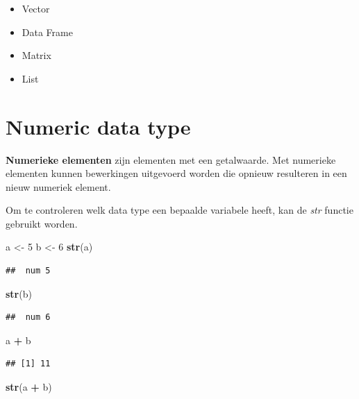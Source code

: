 \documentclass[
]{book}
\newenvironment{Shaded}{\begin{snugshade}}{\end{snugshade}}
\newcommand{\DecValTok}[1]{\textcolor[rgb]{0.00,0.00,0.81}{#1}}
\newcommand{\FunctionTok}[1]{\textcolor[rgb]{0.13,0.29,0.53}{\textbf{#1}}}
\newcommand{\NormalTok}[1]{#1}
\newcommand{\OtherTok}[1]{\textcolor[rgb]{0.56,0.35,0.01}{#1}}
\newcommand{\SpecialCharTok}[1]{\textcolor[rgb]{0.81,0.36,0.00}{\textbf{#1}}}
\providecommand{\tightlist}{%
  \setlength{\itemsep}{0pt}\setlength{\parskip}{0pt}}
\begin{document}
\begin{itemize}
\tightlist
\item
  Vector
\item
  Data Frame
\item
  Matrix
\item
  List
\end{itemize}

\hypertarget{numeric-data-type}{%
\section{Numeric data type}\label{numeric-data-type}}

\textbf{Numerieke elementen} zijn elementen met een getalwaarde. Met numerieke elementen kunnen bewerkingen uitgevoerd worden die opnieuw resulteren in een nieuw numeriek element.

Om te controleren welk data type een bepaalde variabele heeft, kan de \emph{str} functie
gebruikt worden.

\begin{Shaded}
\begin{Highlighting}[]
\NormalTok{a }\OtherTok{\textless{}{-}} \DecValTok{5}
\NormalTok{b }\OtherTok{\textless{}{-}} \DecValTok{6}
\FunctionTok{str}\NormalTok{(a)}
\end{Highlighting}
\end{Shaded}

\begin{verbatim}
##  num 5
\end{verbatim}

\begin{Shaded}
\begin{Highlighting}[]
\FunctionTok{str}\NormalTok{(b)}
\end{Highlighting}
\end{Shaded}

\begin{verbatim}
##  num 6
\end{verbatim}

\begin{Shaded}
\begin{Highlighting}[]
\NormalTok{a }\SpecialCharTok{+}\NormalTok{ b }
\end{Highlighting}
\end{Shaded}

\begin{verbatim}
## [1] 11
\end{verbatim}

\begin{Shaded}
\begin{Highlighting}[]
\FunctionTok{str}\NormalTok{(a }\SpecialCharTok{+}\NormalTok{ b)}
\end{Highlighting}
\end{Shaded}
\end{document}
